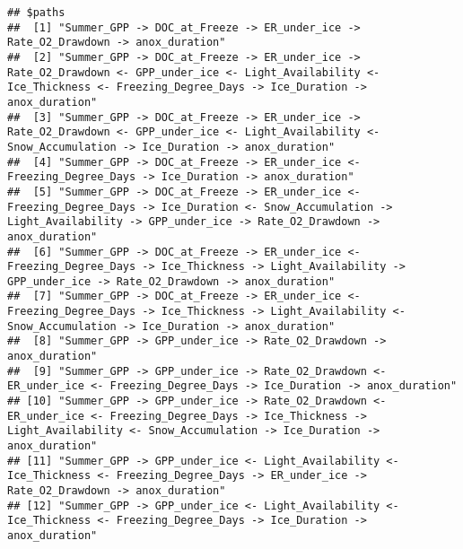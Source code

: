 \documentclass[
]{article}
\begin{document}
\begin{verbatim}
## $paths
##  [1] "Summer_GPP -> DOC_at_Freeze -> ER_under_ice -> Rate_O2_Drawdown -> anox_duration"                                                                                                                              
##  [2] "Summer_GPP -> DOC_at_Freeze -> ER_under_ice -> Rate_O2_Drawdown <- GPP_under_ice <- Light_Availability <- Ice_Thickness <- Freezing_Degree_Days -> Ice_Duration -> anox_duration"                              
##  [3] "Summer_GPP -> DOC_at_Freeze -> ER_under_ice -> Rate_O2_Drawdown <- GPP_under_ice <- Light_Availability <- Snow_Accumulation -> Ice_Duration -> anox_duration"                                                  
##  [4] "Summer_GPP -> DOC_at_Freeze -> ER_under_ice <- Freezing_Degree_Days -> Ice_Duration -> anox_duration"                                                                                                          
##  [5] "Summer_GPP -> DOC_at_Freeze -> ER_under_ice <- Freezing_Degree_Days -> Ice_Duration <- Snow_Accumulation -> Light_Availability -> GPP_under_ice -> Rate_O2_Drawdown -> anox_duration"                          
##  [6] "Summer_GPP -> DOC_at_Freeze -> ER_under_ice <- Freezing_Degree_Days -> Ice_Thickness -> Light_Availability -> GPP_under_ice -> Rate_O2_Drawdown -> anox_duration"                                              
##  [7] "Summer_GPP -> DOC_at_Freeze -> ER_under_ice <- Freezing_Degree_Days -> Ice_Thickness -> Light_Availability <- Snow_Accumulation -> Ice_Duration -> anox_duration"                                              
##  [8] "Summer_GPP -> GPP_under_ice -> Rate_O2_Drawdown -> anox_duration"                                                                                                                                              
##  [9] "Summer_GPP -> GPP_under_ice -> Rate_O2_Drawdown <- ER_under_ice <- Freezing_Degree_Days -> Ice_Duration -> anox_duration"                                                                                      
## [10] "Summer_GPP -> GPP_under_ice -> Rate_O2_Drawdown <- ER_under_ice <- Freezing_Degree_Days -> Ice_Thickness -> Light_Availability <- Snow_Accumulation -> Ice_Duration -> anox_duration"                          
## [11] "Summer_GPP -> GPP_under_ice <- Light_Availability <- Ice_Thickness <- Freezing_Degree_Days -> ER_under_ice -> Rate_O2_Drawdown -> anox_duration"                                                               
## [12] "Summer_GPP -> GPP_under_ice <- Light_Availability <- Ice_Thickness <- Freezing_Degree_Days -> Ice_Duration -> anox_duration"                                                                                   

\end{verbatim}
\end{document}
